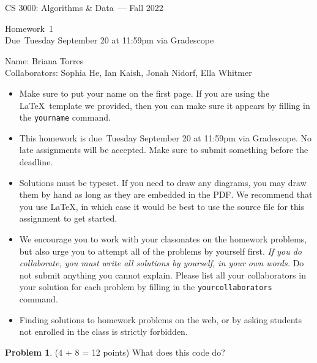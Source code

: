 \documentclass[11pt]{article}
\newcommand{\yourname}{Briana Torres}
\newcommand{\yourcollaborators}{Sophia He, Ian Kaish, Jonah Nidorf, Ella Whitmer}
\theoremstyle{definition}
\theoremstyle{theorem}
\newtheorem{prob}{Problem}
\newcommand{\course}{CS 3000: Algorithms \& Data}
\newcommand{\semester}{Fall 2022}
\newcommand{\hwnum}{1}
\newcommand{\hwdue}{Tuesday September 20 at 11:59pm via Gradescope}
\begin{document}
{\Large 
\begin{center} \course\ --- \semester\ \end{center}}
{\large
\vspace{10pt}
\noindent Homework~\hwnum \vspace{2pt}\\
Due~\hwdue}

\vspace{15pt}
\bigskip
{\large
\noindent Name: \yourname \vspace{2pt}\\ Collaborators: \yourcollaborators}

\vspace{15pt}
\begin{itemize}

\item
  Make sure to put your name on the first page.  If you are using the
  \LaTeX~template we provided, then you can make sure it appears by
  filling in the \texttt{yourname} command.

\item This homework is due~\hwdue.  No late assignments will be accepted.  Make sure to submit something before the deadline.

\item Solutions must be typeset.  If you need to draw any diagrams,
  you may draw them by hand as long as they are embedded in the PDF.
  We recommend that you use \LaTeX, in which case it would be best to
  use the source file for this assignment to get started.

\item We encourage you to work with your classmates on the homework
  problems, but also urge you to attempt all of the problems by
  yourself first. \emph{If you do collaborate, you must write all
    solutions by yourself, in your own words.}  Do not submit anything
  you cannot explain.  Please list all your collaborators in your
  solution for each problem by filling in the
  \texttt{yourcollaborators} command.

\item Finding solutions to homework problems on the web, or by asking
  students not enrolled in the class is strictly forbidden.

\end{itemize}
\newpage

\begin{prob}
  \label{prob:mystery}
(4 + 8 = 12 points)  What does this code do?
\end{prob}
\end{document}
